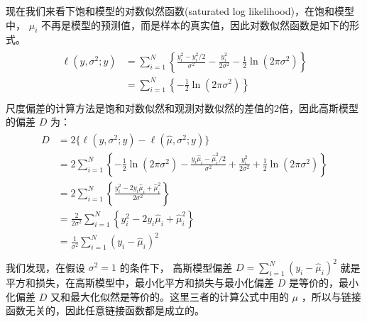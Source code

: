 \documentclass[letterpaper,10pt,english]{sphinxmanual}
\begin{document}
现在我们来看下饱和模型的对数似然函数(saturated log likelihood)，在饱和模型中，
\(\mu_i\) 不再是模型的预测值，而是样本的真实值，因此对数似然函数是如下的形式。
\begin{align}\label{equation:高斯模型/content:高斯模型/content:20}\!\begin{aligned}
\ell(y,\sigma^2;y) &=\sum_{i=1}^N \left \{ \frac{y_i^2 - y_i^2/2}{\sigma^2} -
\frac{y_i^2}{2\sigma^2} - \frac{1}{2} \ln (2\pi\sigma^2) \right \}\\
&= \sum_{i=1}^N \left \{- \frac{1}{2} \ln (2\pi\sigma^2) \right \}\\
\end{aligned}\end{align}
尺度偏差的计算方法是饱和对数似然和观测对数似然的差值的2倍，因此高斯模型的偏差 \(D\) 为：
\begin{align}\label{equation:高斯模型/content:eq_gaussian_040}\!\begin{aligned}
D &= 2  \{ \ell(y,\sigma^2;y) - \ell(\hat{\mu},\sigma^2;y) \}\\
&= 2 \sum_{i=1}^N \left \{
  - \frac{1}{2} \ln (2\pi\sigma^2)
  - \frac{y_i \hat{\mu}_i - \hat{\mu}_i^2/2}{\sigma^2}
 + \frac{y_i^2}{2\sigma^2}
 + \frac{1}{2} \ln (2\pi\sigma^2)   \right \}\\
&= 2  \sum_{i=1}^N \left \{\frac{ y_i^2  -  2y_i \hat{\mu}_i  + \hat{\mu}_i^2 }{2\sigma^2}  \right \}\\
&= \frac{2}{2\sigma^2} \sum_{i=1}^N \left \{ y_i^2  -  2y_i \hat{\mu}_i  + \hat{\mu}_i^2   \right \}\\
&=  \frac{1}{\sigma^2} \sum_{i=1}^N  (y_i-\hat{\mu}_i)^2\\
\end{aligned}\end{align}
我们发现，在假设 \(\sigma^2=1\) 的条件下，
高斯模型偏差 \(D=\sum_{i=1}^N  (y_i-\hat{\mu}_i)^2\) 就是平方和损失，在高斯模型中，最小化平方和损失与最小化偏差 \(D\)
是等价的，最小化偏差 \(D\) 又和最大化似然是等价的。这里三者的计算公式中用的 \(\mu\)
，所以与链接函数无关的，因此任意链接函数都是成立的。
\end{document}
